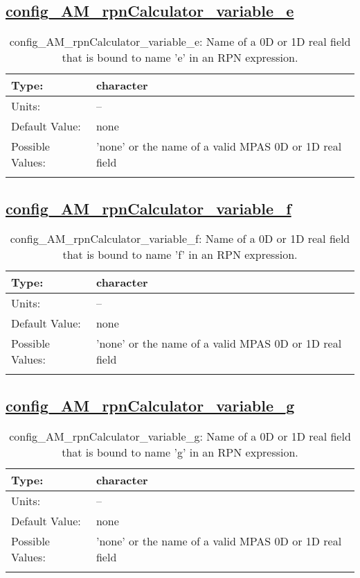 \subsection[config\_AM\_rpnCalculator\_variable\_e]{\hyperref[sec:nm_tab_AM_rpnCalculator]{config\_AM\_rpnCalculator\_variable\_e}}
\label{subsec:nm_sec_config_AM_rpnCalculator_variable_e}
\begin{center}
\begin{longtable}{| p{2.0in} || p{4.0in} |}
    \hline
    Type: & character \\
    \hline
    Units: & -- \\
    \hline
    Default Value: & none \\
    \hline
    Possible Values: & 'none' or the name of a valid MPAS 0D or 1D real field \\
    \hline
    \caption{config\_AM\_rpnCalculator\_variable\_e: Name of a 0D or 1D real field that is bound to name 'e' in an RPN expression.}
\end{longtable}
\end{center}
\subsection[config\_AM\_rpnCalculator\_variable\_f]{\hyperref[sec:nm_tab_AM_rpnCalculator]{config\_AM\_rpnCalculator\_variable\_f}}
\label{subsec:nm_sec_config_AM_rpnCalculator_variable_f}
\begin{center}
\begin{longtable}{| p{2.0in} || p{4.0in} |}
    \hline
    Type: & character \\
    \hline
    Units: & -- \\
    \hline
    Default Value: & none \\
    \hline
    Possible Values: & 'none' or the name of a valid MPAS 0D or 1D real field \\
    \hline
    \caption{config\_AM\_rpnCalculator\_variable\_f: Name of a 0D or 1D real field that is bound to name 'f' in an RPN expression.}
\end{longtable}
\end{center}
\subsection[config\_AM\_rpnCalculator\_variable\_g]{\hyperref[sec:nm_tab_AM_rpnCalculator]{config\_AM\_rpnCalculator\_variable\_g}}
\label{subsec:nm_sec_config_AM_rpnCalculator_variable_g}
\begin{center}
\begin{longtable}{| p{2.0in} || p{4.0in} |}
    \hline
    Type: & character \\
    \hline
    Units: & -- \\
    \hline
    Default Value: & none \\
    \hline
    Possible Values: & 'none' or the name of a valid MPAS 0D or 1D real field \\
    \hline
    \caption{config\_AM\_rpnCalculator\_variable\_g: Name of a 0D or 1D real field that is bound to name 'g' in an RPN expression.}
\end{longtable}
\end{center}
